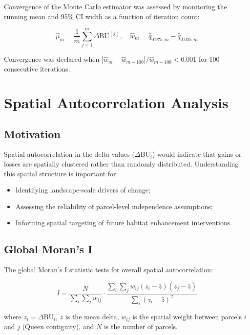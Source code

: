 Convergence of the Monte Carlo estimator was assessed by monitoring the running mean and 95\% CI width as a function of iteration count:

\begin{equation}
\hat{\mu}_m = \frac{1}{m} \sum_{j=1}^{m} \Delta\text{BU}^{(j)}, \quad \hat{w}_m = \hat{q}_{0.975,m} - \hat{q}_{0.025,m}
\label{eq:mc-convergence}
\end{equation}

Convergence was declared when $|\hat{w}_m - \hat{w}_{m-100}| / \hat{w}_{m-100} < 0.001$ for 100 consecutive iterations.


\section{Spatial Autocorrelation Analysis}

\subsection{Motivation}

Spatial autocorrelation in the delta values ($\Delta\text{BU}_i$) would indicate that gains or losses are spatially clustered rather than randomly distributed. Understanding this spatial structure is important for:
\begin{itemize}[nosep]
  \item Identifying landscape-scale drivers of change;
  \item Assessing the reliability of parcel-level independence assumptions;
  \item Informing spatial targeting of future habitat enhancement interventions.
\end{itemize}

\subsection{Global Moran's I}

The global Moran's I statistic tests for overall spatial autocorrelation:

\begin{equation}
I = \frac{N}{\sum_{i}\sum_{j} w_{ij}} \cdot \frac{\sum_{i}\sum_{j} w_{ij}(z_i - \bar{z})(z_j - \bar{z})}{\sum_{i}(z_i - \bar{z})^2}
\label{eq:morans-i}
\end{equation}

\noindent where $z_i = \Delta\text{BU}_i$, $\bar{z}$ is the mean delta, $w_{ij}$ is the spatial weight between parcels $i$ and $j$ (Queen contiguity), and $N$ is the number of parcels.

